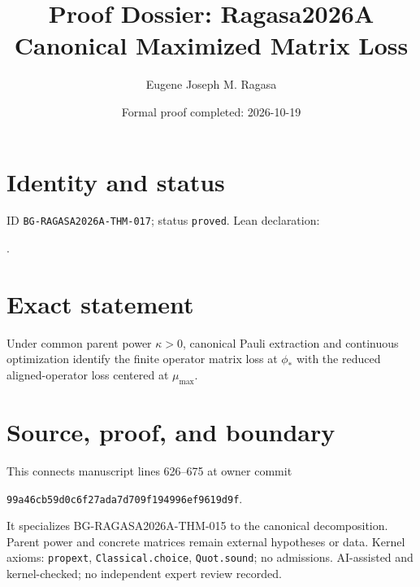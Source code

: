 \documentclass[11pt]{article}
\title{Proof Dossier: Ragasa2026A Canonical Maximized Matrix Loss}\author{Eugene Joseph M. Ragasa}\date{Formal proof completed: 2026-10-19}
\begin{document}
\maketitle
\section{Identity and status}
ID \texttt{BG-RAGASA2026A-THM-017}; status \texttt{proved}. Lean declaration:
\par{}.
\section{Exact statement}
Under common parent power $\kappa>0$, canonical Pauli extraction and continuous
optimization identify the finite operator matrix loss at $\phi_*$ with the reduced
aligned-operator loss centered at $\mu_{\max}$.
\section{Source, proof, and boundary}
This connects manuscript lines 626--675 at owner commit
\begin{center}\small\texttt{99a46cb59d0c6f27ada7d709f194996ef9619d9f}.\end{center}
It specializes BG-RAGASA2026A-THM-015 to the canonical decomposition. Parent power and
concrete matrices remain external hypotheses or data. Kernel axioms: \texttt{propext},
\texttt{Classical.choice}, \texttt{Quot.sound}; no admissions. AI-assisted and
kernel-checked; no independent expert review recorded.
\end{document}
